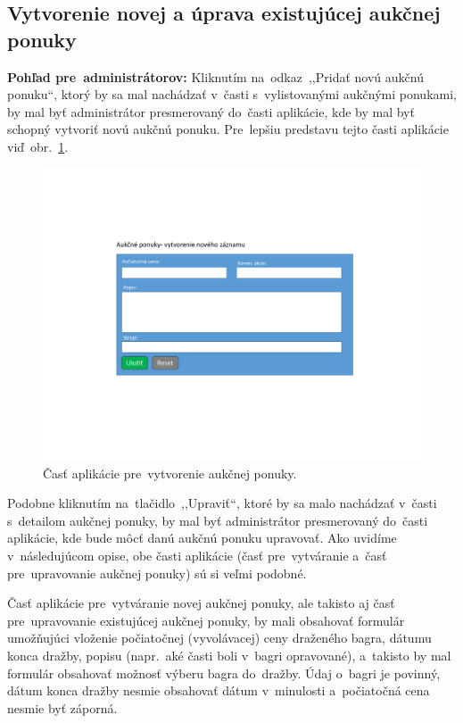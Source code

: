 \subsection{Vytvorenie novej a úprava existujúcej aukčnej ponuky}
\label{vytvorenie novej a uprava existujucej aukcnej ponuky}

\textbf{Pohľad pre~administrátorov:} Kliknutím na~odkaz~,,Pridať novú aukčnú ponuku``, ktorý by sa mal nachádzať v~časti s~vylistovanými aukčnými ponukami, by mal byť administrátor presmerovaný do~časti aplikácie, kde by mal byť schopný vytvoriť novú aukčnú ponuku. Pre~lepšiu predstavu tejto časti aplikácie viď~obr.~\ref{auction offer form}.

\begin{figure}[H]\centering
\includegraphics[width=140mm]{../img/UI concept/auction offer form}
\caption{Časť aplikácie pre~vytvorenie aukčnej ponuky.}
\label{auction offer form}
\end{figure}

Podobne kliknutím na~tlačidlo~,,Upraviť``, ktoré by sa malo nachádzať v~časti s~detailom aukčnej ponuky, by mal byť administrátor presmerovaný do~časti aplikácie, kde bude môcť danú aukčnú ponuku upravovať. Ako uvidíme v~následujúcom opise, obe časti aplikácie (časť pre~vytváranie a~časť pre~upravovanie aukčnej ponuky) sú si veľmi podobné.

Časť aplikácie pre~vytváranie novej aukčnej ponuky, ale takisto aj časť pre~u\-pra\-vo\-va\-nie existujúcej aukčnej ponuky, by mali obsahovať formulár umožňujúci vloženie počiatočnej (vyvolávacej) ceny draženého bagra, dátumu konca dražby, popisu (napr.~aké časti boli v~bagri opravované), a~takisto by mal formulár obsahovať možnosť výberu bagra do~dražby. Údaj o~bagri je povinný, dátum konca dražby nesmie obsahovať dátum v~minulosti a~počiatočná cena nesmie byť záporná.

